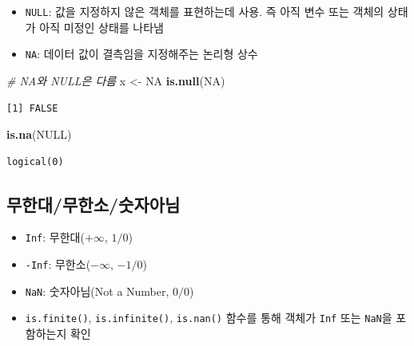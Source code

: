 \documentclass[
  11pt,
]{krantz}
\newenvironment{Shaded}{\begin{snugshade}}{\end{snugshade}}
\newcommand{\CommentTok}[1]{\textcolor[rgb]{0.37,0.37,0.37}{\textit{#1}}}
\newcommand{\KeywordTok}[1]{\textcolor[rgb]{0.27,0.27,0.27}{\textbf{#1}}}
\newcommand{\NormalTok}[1]{#1}
\newcommand{\OtherTok}[1]{\textcolor[rgb]{0.37,0.37,0.37}{#1}}
\newcommand{\StringTok}[1]{\textcolor[rgb]{0.5,0.5,0.5}{#1}}
\providecommand{\tightlist}{%
  \setlength{\itemsep}{0pt}\setlength{\parskip}{0pt}}
\begin{document}
\begin{itemize}
\tightlist
\item
  \texttt{NULL}: 값을 지정하지 않은 객체를 표현하는데 사용. 즉 아직 변수 또는 객체의 상태가 아직 미정인 상태를 나타냄
\item
  \texttt{NA}: 데이터 값이 결측임을 지정해주는 논리형 상수
\end{itemize}

\normalsize

\footnotesize

\begin{Shaded}
\begin{Highlighting}[]
\CommentTok{# NA와 NULL은 다름}
\NormalTok{x <-}\StringTok{ }\OtherTok{NA}
\KeywordTok{is.null}\NormalTok{(}\OtherTok{NA}\NormalTok{)}
\end{Highlighting}
\end{Shaded}

\begin{verbatim}
[1] FALSE
\end{verbatim}

\begin{Shaded}
\begin{Highlighting}[]
\KeywordTok{is.na}\NormalTok{(}\OtherTok{NULL}\NormalTok{)}
\end{Highlighting}
\end{Shaded}

\begin{verbatim}
logical(0)
\end{verbatim}

\normalsize

\hypertarget{finite}{%
\subsection{무한대/무한소/숫자아님}\label{finite}}

\begin{itemize}
\tightlist
\item
  \texttt{Inf}: 무한대(\(+\infty\), \(1/0\))
\item
  \texttt{-Inf}: 무한소(\(-\infty\), \(-1/0\))
\item
  \texttt{NaN}: 숫자아님(Not a Number, \(0/0\))
\item
  \texttt{is.finite()}, \texttt{is.infinite()}, \texttt{is.nan()} 함수를 통해 객체가 \texttt{Inf} 또는 \texttt{NaN}을 포함하는지 확인
\end{itemize}

\footnotesize
\end{document}
